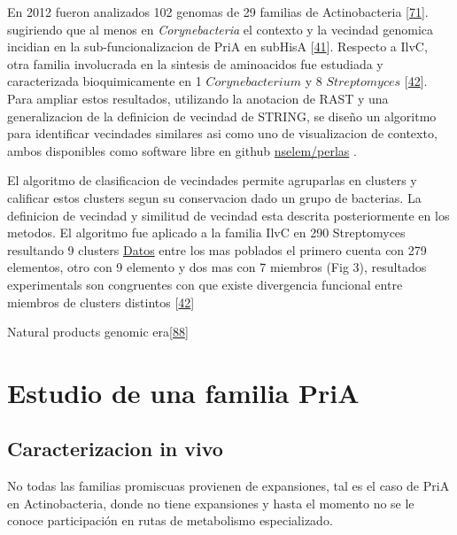 \documentclass[12pt,twoside]{reedthesis}
\begin{document}
  En 2012 fueron analizados 102 genomas de 29 familias de Actinobacteria
  {[}\protect\hyperlink{ref-noda_tesis_2012}{71}{]}. sugiriendo que al
  menos en \emph{Corynebacteria} el contexto y la vecindad genomica
  incidian en la sub-funcionalizacion de PriA en subHisA
  {[}\protect\hyperlink{ref-noda-garcia_evolution_2013}{41}{]}. Respecto a
  IlvC, otra familia involucrada en la sintesis de aminoacidos fue
  estudiada y caracterizada bioquimicamente en 1 \(Corynebacterium\) y 8
  \(Streptomyces\)
  {[}\protect\hyperlink{ref-verdel-aranda_molecular_2015}{42}{]}. Para
  ampliar estos resultados, utilizando la anotacion de RAST y una
  generalizacion de la definicion de vecindad de STRING, se diseño un
  algoritmo para identificar vecindades similares asi como uno de
  visualizacion de contexto, ambos disponibles como software libre en
  github \href{https://github.com/nselem/perlas}{nselem/perlas} .
  
  El algoritmo de clasificacion de vecindades permite agruparlas en
  clusters y calificar estos clusters segun su conservacion dado un grupo
  de bacterias. La definicion de vecindad y similitud de vecindad esta
  descrita posteriormente en los metodos. El algoritmo fue aplicado a la
  familia IlvC en 290 Streptomyces resultando 9 clusters
  \href{http://148.247.230.43/nselem/CONTEXTS/REL_St275/ilvC/Contextos.php}{Datos}
  entre los mas poblados el primero cuenta con 279 elementos, otro con 9
  elemento y dos mas con 7 miembros (Fig 3), resultados experimentals son
  congruentes con que existe divergencia funcional entre miembros de
  clusters distintos
  {[}\protect\hyperlink{ref-verdel-aranda_molecular_2015}{42}{]}
  
  Natural products genomic
  era{[}\protect\hyperlink{ref-harvey_re-emergence_2015}{88}{]}
  
  \section{Estudio de una familia PriA}\label{estudio-de-una-familia-pria}
  
  \subsection{Caracterizacion in vivo}\label{caracterizacion-in-vivo}
  
  No todas las familias promiscuas provienen de expansiones, tal es el
  caso de PriA en Actinobacteria, donde no tiene expansiones y hasta el
  momento no se le conoce participación en rutas de metabolismo
  especializado.
  
\end{document}
